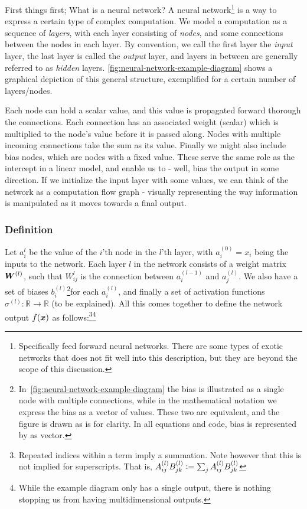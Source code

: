 \documentclass[Thesis.tex]{subfiles}
\begin{document}
First things first; What is a neural network? A neural
network\footnote{Specifically feed forward neural networks. There are some types
of exotic networks that does not fit well into this description, but they are
beyond the scope of this discussion.} is a way to express a certain type of
complex computation. We model a computation as a sequence of \emph{layers}, with
each layer consisting of \emph{nodes}, and some connections between the nodes in
each layer. By convention, we call the first layer the \emph{input} layer, the
last layer is called the \emph{output} layer, and layers in between are
generally referred to as \emph{hidden} layers.
\cref{fig:neural-network-example-diagram} shows a graphical depiction of this
general structure, exemplified for a certain number of layers/nodes.

Each node can hold a scalar value, and this value is propagated forward thorough
the connections. Each connection has an associated weight (scalar) which is
multiplied to the node's value before it is passed along. Nodes with multiple
incoming connections take the sum as its value. Finally we might also include
bias nodes, which are nodes with a fixed value. These serve the same role as the
intercept in a linear model, and enable us to - well, bias the output in some
direction. If we initialize the input layer with some values, we can think of
the network as a computation flow graph - visually representing the way
information is manipulated as it moves towards a final output.

\subsubsection{Definition}
\label{sec:ml-ann-forward-def}

 Let $a_i^{l}$ be the value of the $i$'th node in the $l$'th layer, with
$a_i^{(0)}=x_i$ being the inputs to the network. Each layer $l$ in the network
consists of a weight matrix $\bm{W}^{(l)}$, such that $W_{ij}^{l}$ is the
connection between $a_i^{(l-1)}$ and $a_j^{(l)}$. We also have a set of biases
$b_i^{(l)}$\footnote{In~\cref{fig:neural-network-example-diagram} the bias is
illustrated as a single node with multiple connections, while in the
mathematical notation we express the bias as a vector of values. These two are
equivalent, and the figure is drawn as is for clarity. In all equations and
code, bias is represented by as vector.}for each $a_i^{(l)}$, and finally a set
of activation functions $\sigma^{(l)}: \mathbb{R}\to\mathbb{R}$ (to be
explained). All this comes together to define the network output $f(\bm{x})$ as
follows:\footnote{Repeated indices within a term imply a summation. Note however
that this is not implied for superscripts. That is, $A_{ij}^{(l)}B_{jk}^{(l)}
\vcentcolon= \sum_{j} A_{ij}^{(l)}B_{jk}^{(l)}$}\footnote{While the example diagram
only has a single output, there is nothing stopping us from having
multidimensional outputs.}
\end{document}

